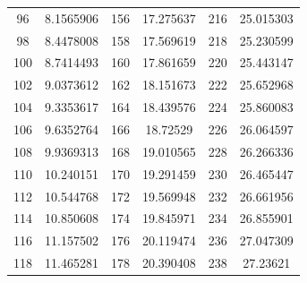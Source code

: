 \documentclass[
	12pt,				%
	openright,			%
	twoside,			%
	a4paper,			%
	english,			%
	french,				%
	spanish,			%
	brazil,				%
	]{abntex2}
\begin{document}
\begin{apendicesenv}
\begin{table}[H]
\begin{tabular}{c c| c c | c c}
96 & 8.1565906 & 156 & 17.275637 & 216 & 25.015303\\
98 & 8.4478008 & 158 & 17.569619 & 218 & 25.230599\\
100 & 8.7414493 & 160 & 17.861659 & 220 & 25.443147\\
102 & 9.0373612 & 162 & 18.151673 & 222 & 25.652968\\
104 & 9.3353617 & 164 & 18.439576 & 224 & 25.860083\\
106 & 9.6352764 & 166 & 18.72529 & 226 & 26.064597\\
108 & 9.9369313 & 168 & 19.010565 & 228 & 26.266336\\
110 & 10.240151 & 170 & 19.291459 & 230 & 26.465447\\
112 & 10.544768 & 172 & 19.569948 & 232 & 26.661956\\
114 & 10.850608 & 174 & 19.845971 & 234 & 26.855901\\
116 & 11.157502 & 176 & 20.119474 & 236 & 27.047309\\
118 & 11.465281 & 178 & 20.390408 & 238 & 27.23621
\end{tabular}
\end{table}


\end{apendicesenv}
\end{document}
